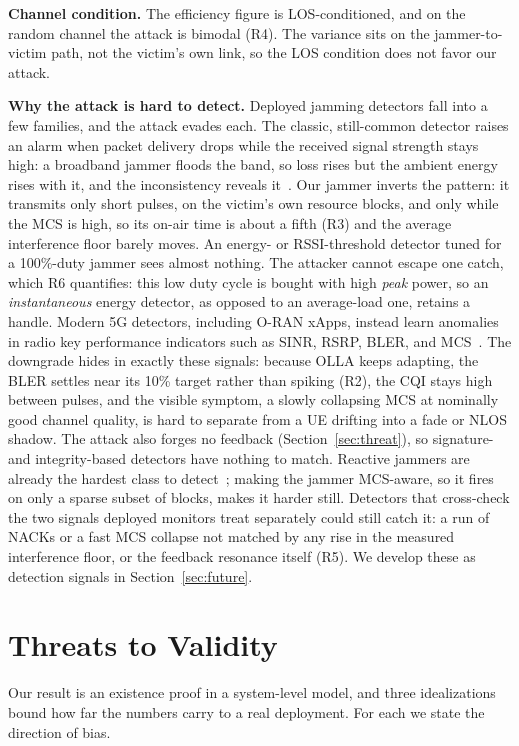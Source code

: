 \documentclass[conference]{IEEEtran}
\begin{document}
\textbf{Channel condition.} The efficiency figure is LOS-conditioned, and on the random
channel the attack is bimodal (R4). The variance sits on the
jammer-to-victim path, not the victim's own link, so the LOS condition does not favor our
attack.

\textbf{Why the attack is hard to detect.} Deployed jamming detectors fall into a few
families, and the attack evades each. The classic, still-common detector raises an alarm
when packet delivery drops while the received signal strength stays high: a broadband
jammer floods the band, so loss rises but the ambient energy rises with it, and the
inconsistency reveals it~\cite{xu2005feasibility}. Our jammer inverts the pattern: it
transmits only short pulses, on the victim's own resource blocks, and only while the MCS is
high, so its on-air time is about a fifth (R3) and the average interference floor barely
moves. An energy- or RSSI-threshold detector tuned for a 100\%-duty jammer sees almost
nothing. The attacker cannot escape one catch, which R6 quantifies: this low duty cycle is
bought with high \emph{peak} power, so an \emph{instantaneous} energy detector, as opposed
to an average-load one, retains a handle. Modern 5G detectors, including O-RAN xApps,
instead learn anomalies in radio key performance indicators such as SINR, RSRP, BLER, and
MCS~\cite{hachimi2020multistage,pirayesh2022survey}. The downgrade hides in exactly these
signals: because OLLA keeps adapting, the BLER settles near its 10\% target rather than
spiking (R2), the CQI stays high between pulses, and the visible symptom, a slowly
collapsing MCS at nominally good channel quality, is hard to separate from a UE drifting
into a fade or NLOS shadow. The attack also forges no feedback (Section~\ref{sec:threat}),
so signature- and integrity-based detectors have nothing to match. Reactive jammers are
already the hardest class to detect~\cite{wilhelm2011reactive,pirayesh2022survey}; making
the jammer MCS-aware, so it fires on only a sparse subset of blocks, makes it harder still.
Detectors that cross-check the two signals deployed monitors treat separately could still
catch it: a run of NACKs or a fast MCS collapse not matched by any rise in the measured
interference floor, or the feedback resonance itself (R5). We develop these as detection
signals in Section~\ref{sec:future}.

\section{Threats to Validity}
\label{sec:validity}
Our result is an existence proof in a system-level model, and three idealizations bound
how far the numbers carry to a real deployment. For each we state the direction of bias.
\end{document}

